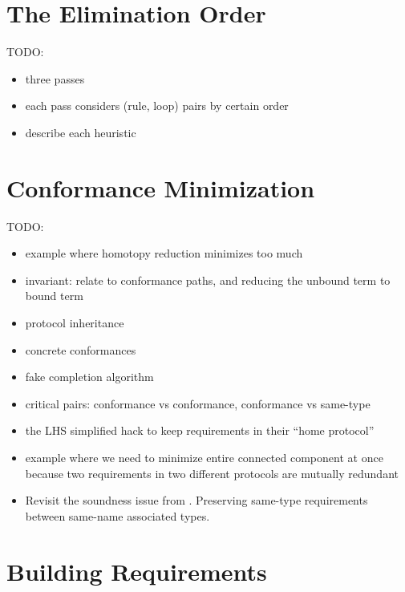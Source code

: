 \documentclass[../generics]{subfiles}
\begin{document}
\section[]{The Elimination Order}\label{elimination order}

\ifWIP
TODO:
\begin{itemize}
\item three passes
\item each pass considers (rule, loop) pairs by certain order
\item describe each heuristic
\end{itemize}
\fi

\section[]{Conformance Minimization}\label{minimal conformances}

\ifWIP


TODO:
\begin{itemize}
\item example where homotopy reduction minimizes too much
\item invariant: relate to conformance paths, and reducing the unbound term to bound term
\item protocol inheritance
\item concrete conformances
\item fake completion algorithm
\item critical pairs: conformance vs conformance, conformance vs same-type
\item the LHS simplified hack to keep requirements in their ``home protocol''
\item example where we need to minimize entire connected component at once because two requirements in two different protocols are mutually redundant
\item Revisit the soundness issue from . Preserving same-type requirements between same-name associated types.
\end{itemize}

\fi

\section[]{Building Requirements}\label{requirement builder}
\end{document}
